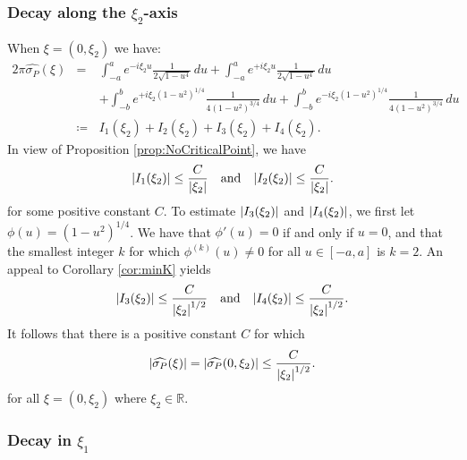 \documentclass[11pt]{article}
\newcommand{\f}[2]{\frac{#1}{#2}}
\begin{document}
\subsubsection{Decay along the $\xi_2$-axis}

When $\xi = (0,\xi_2)$ we have:
\begin{eqnarray*}
    2\pi \widehat{\sigma_P}(\xi) 
    &=& \int_{-a}^a  e^{-i \xi_2 u} \f{1}{2\sqrt{1-u^4}}\,du  + \int_{-a}^a  e^{+i \xi_2 u} \f{1}{2\sqrt{1-u^4}}\,du \\
    &\quad& + \int_{-b}^b e^{+i \xi_2 (1-u^2)^{1/4}} \f{1}{4(1 - u^2)^{3/4}} \,du + \int_{-b}^b e^{-i \xi_2 (1-u^2)^{1/4}} \f{1}{4(1 - u^2)^{3/4}}\,du \\
    &\coloneqq& I_1(\xi_2) + I_2(\xi_2) + I_3(\xi_2) + I_4(\xi_2).
\end{eqnarray*}
In view of Proposition \ref{prop:NoCriticalPoint}, we have
\begin{equation*}
    \abs{I_1(\xi_2)} \leq \f{C}{\abs{\xi_2}} \quad \mbox{and} \quad \abs{I_2(\xi_2)} \leq \f{C}{\abs{\xi_2}}.
\end{equation*}
for some positive constant $C$. To estimate $\abs{I_3(\xi_2)}$ and $\abs{I_4(\xi_2)}$, we first let $\phi(u) = (1-u^2)^{1/4}$. We have that $\phi'(u) = 0$ if and only if $u=0$, and that the smallest integer $k$ for which $\phi^{(k)}(u) \neq 0$ for all $u\in [-a,a]$ is $k=2$. An appeal to Corollary \ref{cor:minK} yields
\begin{equation*}
    \abs{I_3(\xi_2)} \leq \f{C}{\abs{\xi_2}^{1/2}} \quad \mbox{and} \quad \abs{I_4(\xi_2)} \leq \f{C}{\abs{\xi_2}^{1/2}}.
\end{equation*}
It follows that there is a positive constant $C$ for which
\begin{equation*}
    \abs{\widehat{\sigma_P}(\xi) }=\abs{\widehat{\sigma_P}(0,\xi_2) } \leq \f{C}{\abs{\xi_2}^{1/2}}.
\end{equation*}
for all $\xi=(0,\xi_2)$ where $\xi_2\in\mathbb{R}$.




\subsubsection{Decay in $\xi_1$}
\end{document}
